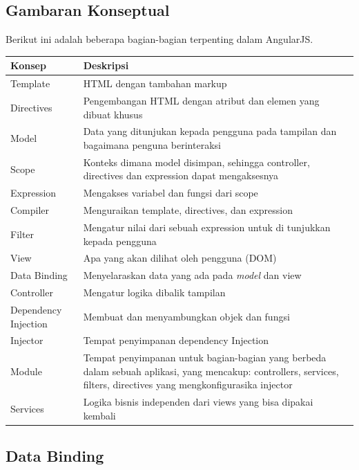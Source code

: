 	\subsection{Gambaran Konseptual}
	\label{sub: gambaranKonsep}
		Berikut ini adalah beberapa bagian-bagian terpenting dalam AngularJS.
		\begin{center}
			\begin{tabular}{| m{5cm} | m{10cm} |}
				\hline
				Konsep & Deskripsi \\
				\hline
				Template & HTML dengan tambahan markup \\
				\hline
				Directives & Pengembangan HTML dengan atribut dan elemen yang dibuat khusus \\
				\hline
				Model & Data yang ditunjukan kepada pengguna pada tampilan dan bagaimana penguna berinteraksi \\
				\hline
				Scope & Konteks dimana model disimpan, sehingga controller, directives dan expression dapat mengaksesnya \\
				\hline
				Expression & Mengakses variabel dan fungsi dari scope \\
				\hline
				Compiler & Menguraikan template, directives, dan expression \\
				\hline
				Filter & Mengatur nilai dari sebuah expression untuk di tunjukkan kepada pengguna \\
				\hline
				View & Apa yang akan dilihat oleh pengguna (DOM) \\
				\hline
				Data Binding & Menyelaraskan data yang ada pada \textit{model} dan view \\
				\hline
				Controller & Mengatur logika dibalik tampilan \\
				Dependency Injection & Membuat dan menyambungkan objek dan fungsi \\
				\hline
				Injector & Tempat penyimpanan dependency Injection \\
				\hline
				Module & Tempat penyimpanan untuk bagian-bagian yang berbeda dalam sebuah aplikasi, yang mencakup: controllers, services, filters, directives yang mengkonfigurasika injector \\
				\hline
				Services & Logika bisnis independen dari views yang bisa dipakai kembali  \\
				\hline
				\end{tabular}
			\end{center}
	
	\subsection{Data Binding}
	\label{sub: dataBinding}
		
